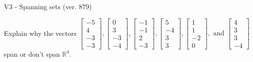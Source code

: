 \begin{exercise}
  \begin{exerciseTitle}V3 - Spanning sets (ver. 879)\end{exerciseTitle}
  \begin{exerciseStatement}
    Explain why the vectors \(\left[\begin{array}{r}
-5 \\
4 \\
-3 \\
-3
\end{array}\right] , \left[\begin{array}{r}
0 \\
3 \\
-3 \\
-4
\end{array}\right] , \left[\begin{array}{r}
-1 \\
-1 \\
2 \\
-3
\end{array}\right] , \left[\begin{array}{r}
5 \\
-4 \\
3 \\
3
\end{array}\right] , \left[\begin{array}{r}
1 \\
1 \\
-2 \\
0
\end{array}\right] , \text{ and } \left[\begin{array}{r}
4 \\
3 \\
3 \\
-4
\end{array}\right]\) span or don't span \(\mathbb{R}^4\). 
	



\end{exerciseStatement}
\end{exercise}
